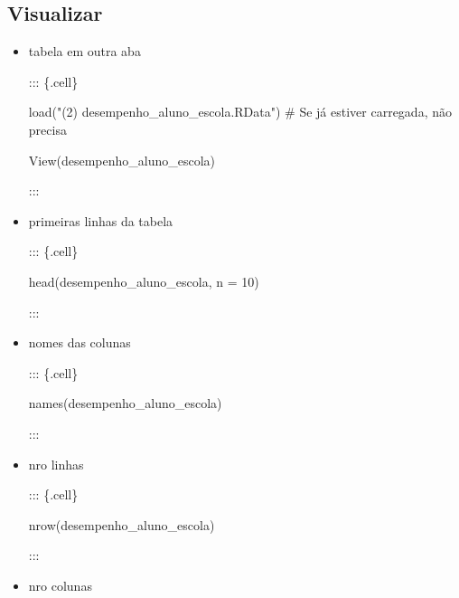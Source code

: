 \documentclass[
  letterpaper,
  DIV=11,
  numbers=noendperiod]{scrreprt}
\newenvironment{Shaded}{\begin{snugshade}}{\end{snugshade}}
\newcommand{\AttributeTok}[1]{\textcolor[rgb]{0.40,0.45,0.13}{#1}}
\newcommand{\CommentTok}[1]{\textcolor[rgb]{0.37,0.37,0.37}{#1}}
\newcommand{\DecValTok}[1]{\textcolor[rgb]{0.68,0.00,0.00}{#1}}
\newcommand{\FunctionTok}[1]{\textcolor[rgb]{0.28,0.35,0.67}{#1}}
\newcommand{\NormalTok}[1]{\textcolor[rgb]{0.00,0.23,0.31}{#1}}
\newcommand{\StringTok}[1]{\textcolor[rgb]{0.13,0.47,0.30}{#1}}
\begin{document}
\hypertarget{visualizar}{%
\subsection{Visualizar}\label{visualizar}}

\begin{itemize}
\item
  tabela em outra aba

  ::: \{.cell\}

\begin{Shaded}
\begin{Highlighting}[]
\FunctionTok{load}\NormalTok{(}\StringTok{"(2) desempenho\_aluno\_escola.RData"}\NormalTok{) }\CommentTok{\# Se já estiver carregada, não precisa}

\FunctionTok{View}\NormalTok{(desempenho\_aluno\_escola)}
\end{Highlighting}
\end{Shaded}

  :::
\item
  primeiras linhas da tabela

  ::: \{.cell\}

\begin{Shaded}
\begin{Highlighting}[]
\FunctionTok{head}\NormalTok{(desempenho\_aluno\_escola, }\AttributeTok{n =} \DecValTok{10}\NormalTok{)}
\end{Highlighting}
\end{Shaded}

  :::
\item
  nomes das colunas

  ::: \{.cell\}

\begin{Shaded}
\begin{Highlighting}[]
\FunctionTok{names}\NormalTok{(desempenho\_aluno\_escola)}
\end{Highlighting}
\end{Shaded}

  :::
\item
  nro linhas

  ::: \{.cell\}

\begin{Shaded}
\begin{Highlighting}[]
\FunctionTok{nrow}\NormalTok{(desempenho\_aluno\_escola)}
\end{Highlighting}
\end{Shaded}

  :::
\item
  nro colunas


\end{itemize}
\end{document}
